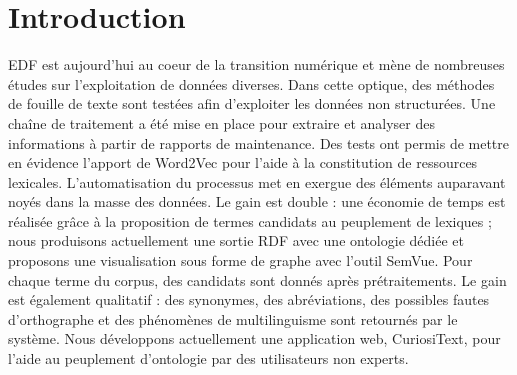 \section{Introduction}

EDF est aujourd’hui au coeur de la transition numérique et mène de nombreuses études sur l’exploitation de données diverses. Dans cette optique, des méthodes de fouille de texte sont testées afin d’exploiter les données non structurées. Une chaîne de traitement a été mise en place pour extraire et analyser des informations à partir de rapports de maintenance. Des tests ont permis de mettre en évidence l’apport de Word2Vec \cite{DBLP:journals/corr/abs-1301-3781} pour l’aide à la constitution de ressources lexicales. L’automatisation du processus met en exergue des éléments auparavant noyés dans la masse des données. Le gain est double : une économie de temps est réalisée grâce à la proposition de termes candidats au peuplement de lexiques ; nous produisons actuellement une sortie RDF avec une ontologie dédiée et proposons une visualisation sous forme de graphe avec l’outil SemVue. Pour chaque terme du corpus, des candidats sont donnés après prétraitements. Le gain est également qualitatif : des synonymes, des abréviations, des possibles fautes d’orthographe et des phénomènes de multilinguisme sont retournés par le système. Nous développons actuellement une application web, CuriosiText, pour l’aide au peuplement d’ontologie par des utilisateurs non experts.

